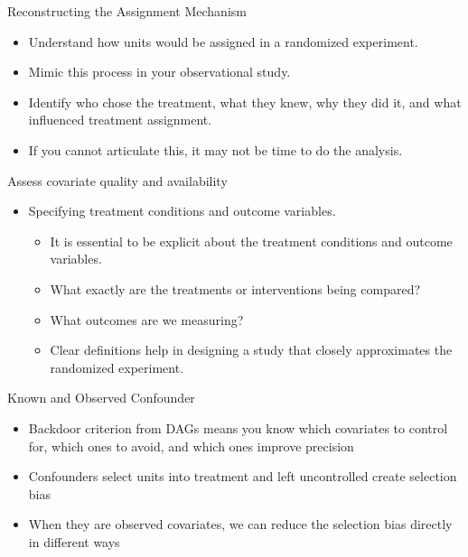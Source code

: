 \documentclass{beamer}
\begin{document}
\begin{frame}{Reconstructing the Assignment Mechanism}
  \begin{itemize}
    \item Understand how units would be assigned in a randomized experiment.
    \item Mimic this process in your observational study.
    \item Identify who chose the treatment, what they knew, why they did it, and what influenced treatment assignment.
    \item If you cannot articulate this, it may not be time to do the analysis.
  \end{itemize}
\end{frame}


\begin{frame}{Assess covariate quality and availability}
  \begin{itemize}

    \item Specifying treatment conditions and outcome variables.
    	\begin{itemize}
	\item It is essential to be explicit about the treatment conditions and outcome variables. 
	\item What exactly are the treatments or interventions being compared? 
	\item What outcomes are we measuring? 
	\item Clear definitions help in designing a study that closely approximates the randomized experiment.
	\end{itemize}
\end{itemize}

\end{frame}





\begin{frame}{Known and Observed Confounder}

	\begin{itemize}
	\item Backdoor criterion from DAGs means you know which covariates to control for, which ones to avoid, and which ones improve precision
	\item Confounders select units into treatment and left uncontrolled create selection bias
	\item When they are observed covariates, we can reduce the selection bias directly in different ways
	\end{itemize}

\end{frame}
\end{document}
